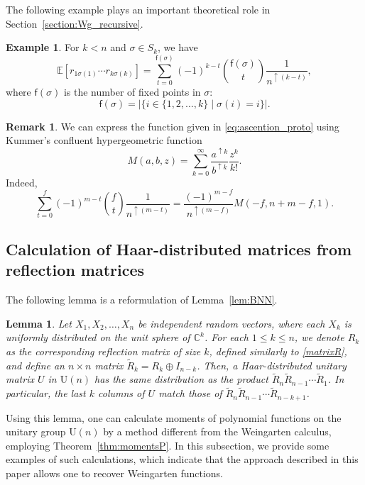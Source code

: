 \documentclass[10pt,a4paper]{amsart}
\numberwithin{equation}{section}
\newtheorem{Lemma}[Theorem]{Lemma}
\theoremstyle{definition}
\newtheorem{Example}[Theorem]{Example}
\newtheorem{Remark}[Theorem]{Remark}
\newcommand{\UU}{\mathrm{U}}
\newcommand{\fix}[1]{\mathsf{f}(#1)}
\begin{document}
The following example plays an important theoretical role in Section~\ref{section:Wg_recursive}.

\begin{Example} \label{ex:permutation_r}
For $k<n$ and $\sigma \in S_k$, we have
 \[
 \mathbb{E}[r_{1\sigma(1)} \cdots r_{k \sigma(k)}]= \sum_{t=0}^{\fix{\sigma}} (-1)^{k-t} \binom{\fix{\sigma}}{t} \frac{1}{n^{\uparrow (k-t)}},
 \]
 where $\fix{\sigma}$ is the number of fixed points in $\sigma$:
 \[
 \fix{\sigma} =|\{i \in \{1,2,\dots,k\} \mid \sigma(i)=i\}|.
 \]
\end{Example}

\begin{Remark}
We can express the function given in \eqref{eq:ascention_proto}
using Kummer's confluent hypergeometric function
\[
M(a,b,z)= \sum_{k=0}^\infty \frac{a^{\uparrow k}}{b^{\uparrow k}} \frac{z^k}{k!}.
\]
Indeed,
\[
\sum_{t=0}^f (-1)^{m-t} \binom{f}{t} \frac{1}{n^{\uparrow (m-t)}}
= \frac{(-1)^{m-f}}{n^{\uparrow (m-f)}} M(-f,n+m-f,1).
\]
\end{Remark}



\subsection{Calculation of Haar-distributed matrices from reflection matrices}\label{sec:compute-integral}


The following lemma is a reformulation of Lemma~\ref{lem:BNN}.

\begin{Lemma}
\label{lem:BNN_g}
Let $X_1,X_2, \dots, X_n$ be independent random vectors, where
each $X_k$ is uniformly distributed on the unit sphere of $\mathbb{C}^k$.
For each $1 \le k \le n$, we denote $R_k$ as the corresponding reflection matrix of size $k$, defined similarly to \eqref{matrixR},
and define an $n \times n$ matrix $\tilde{R}_k = R_k \oplus I_{n-k}$.
Then, a Haar-distributed unitary matrix $U$ in $\UU(n)$ has the same distribution as
the product $\tilde{R}_n \tilde{R}_{n-1} \cdots \tilde{R}_1$.
In particular, the last $k$ columns of $U$ match those of $\tilde{R}_n \tilde{R}_{n-1} \cdots \tilde{R}_{n-k+1}$.
\end{Lemma}

Using this lemma, one can calculate moments of polynomial functions on the unitary group $\UU(n)$ by a method different from the Weingarten calculus, employing Theorem~\ref{thm:momentsP}.
In this subsection, we provide some examples of such calculations, which indicate that the approach described in this paper allows one to recover Weingarten functions.
\end{document}
